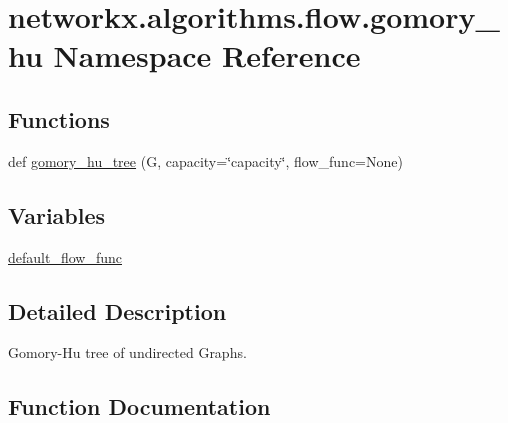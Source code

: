 \hypertarget{namespacenetworkx_1_1algorithms_1_1flow_1_1gomory__hu}{}\section{networkx.\+algorithms.\+flow.\+gomory\+\_\+hu Namespace Reference}
\label{namespacenetworkx_1_1algorithms_1_1flow_1_1gomory__hu}
\subsection*{Functions}
\begin{DoxyCompactItemize}
\item 
def \hyperlink{namespacenetworkx_1_1algorithms_1_1flow_1_1gomory__hu_a41fb71d346443b3cd4aad41da5b34898}{gomory\+\_\+hu\+\_\+tree} (G, capacity=\char`\"{}capacity\char`\"{}, flow\+\_\+func=None)
\end{DoxyCompactItemize}
\subsection*{Variables}
\begin{DoxyCompactItemize}
\item 
\hyperlink{namespacenetworkx_1_1algorithms_1_1flow_1_1gomory__hu_aa1afc2e8ccfa59dafa1a29e4c737326a}{default\+\_\+flow\+\_\+func}
\end{DoxyCompactItemize}


\subsection{Detailed Description}
\begin{DoxyVerb}Gomory-Hu tree of undirected Graphs.
\end{DoxyVerb}
 

\subsection{Function Documentation}
\mbox{\label{namespacenetworkx_1_1algorithms_1_1flow_1_1gomory__hu_a41fb71d346443b3cd4aad41da5b34898}} 
